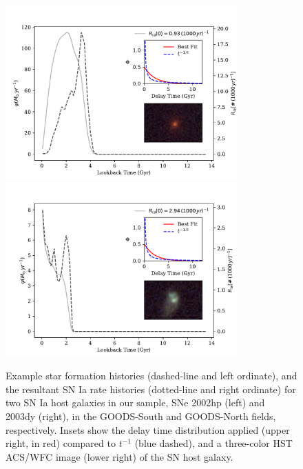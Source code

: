 \documentclass[apj]{aastex62}
\begin{document}
\begin{figure}[t] %
   \includegraphics[width=3.5in]{figure_sfh_demo_v1.pdf} 
   \includegraphics[width=3.5in]{figure_sfh_demo_v2.pdf} 
   \caption{\footnotesize Example star formation histories (dashed-line and left ordinate), and the resultant SN Ia rate histories (dotted-line and right ordinate) for two SN Ia host galaxies in our sample, SNe 2002hp (left) and 2003dy (right), in the GOODS-South and GOODS-North fields, respectively. Insets show the delay time distribution applied (upper right, in red) compared to $t^{-1}$ (blue dashed), and a three-color HST ACS/WFC image (lower right) of the SN host galaxy.}
   \label{fig:figure_sfh_fit_demo}
\end{figure}
\end{document}
